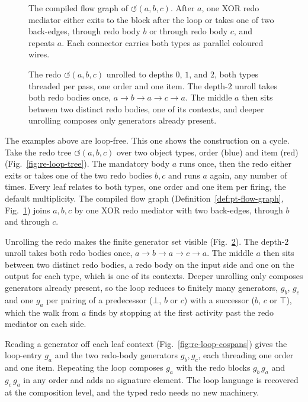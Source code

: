 \begin{figure}[tb]
  \centering
  \unskip
  \caption{The compiled flow graph of $\circlearrowleft(a,b,c)$. After $a$, one XOR redo mediator
    either exits to the block after the loop or takes one of two back-edges, through redo body $b$ or
    through redo body $c$, and repeats $a$. Each connector carries both types as parallel coloured
    wires.}
  \label{fig:re-loop}
\end{figure}

\begin{figure}[tp]
  \centering
  \unskip
  \caption{The redo $\circlearrowleft(a,b,c)$ unrolled to depths $0$, $1$, and $2$, both types
    threaded per pass, one order and one item. The depth-$2$ unroll takes
    both redo bodies once, $a\to b\to a\to c\to a$. The middle $a$ then sits between two distinct
    redo bodies, one of its contexts, and deeper unrolling composes only generators already present.}
  \label{fig:re-pt-unroll}
\end{figure}

\begin{exmp}
  \label{ex:running-ptree-loop}
  The examples above are loop-free. This one shows the construction on a cycle. Take the redo tree $\circlearrowleft(a,b,c)$ over two object types,
  $\mathrm{order}$ (blue) and $\mathrm{item}$ (red) (Fig.~\ref{fig:re-loop-tree}). The mandatory body
  $a$ runs once, then the redo either exits or takes one of the two redo bodies $b,c$ and runs $a$
  again, any number of times. Every leaf relates to both types, one order and one item per firing, the default
  multiplicity. The compiled flow graph
  (Definition~\ref{def:pt-flow-graph}, Fig.~\ref{fig:re-loop}) joins $a,b,c$ by one XOR redo mediator
  with two back-edges, through $b$ and through $c$.

  Unrolling the redo makes the finite generator set visible (Fig.~\ref{fig:re-pt-unroll}). The
  depth-$2$ unroll takes both redo bodies once, $a\to b\to a\to c\to a$. The middle $a$ then sits
  between two distinct redo bodies, a redo body on the input side and one on the output for each
  type, which is one of its contexts. Deeper unrolling only composes generators already present, so
  the loop reduces to finitely many generators, $g_b$, $g_c$ and one $g_a$ per pairing of a predecessor ($\bot$, $b$ or $c$) with a successor ($b$, $c$ or $\top$), which the walk from $a$ finds by
  stopping at the first activity past the redo mediator on each side.

  Reading a generator off each leaf context (Fig.~\ref{fig:re-loop-cospans}) gives the loop-entry
  $g_a$ and the two redo-body generators $g_b,g_c$, each threading one order and
  one item. Repeating the loop composes $g_a$ with the redo blocks
  $g_b\,g_a$ and $g_c\,g_a$ in any order and adds no signature element. The loop language is
  recovered at the composition level, and the typed redo needs no new machinery.
\end{exmp}

